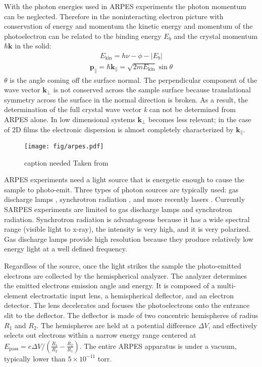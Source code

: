 \documentclass[12pt]{article}
\begin{document}
With the photon energies used in ARPES experiments the photon momentum can be neglected.
Therefore in the noninteracting electron picture with conservation of energy and momentum the kinetic energy and momentum of the photoelectron can be related to the binding energy $E_b$ and the crystal momentum $\hbar\boldsymbol{k}$ in the solid\cite{Damascelli}:
\begin{align}
  E_{\text{kin}}=h\nu-\phi-|E_b|
\end{align}
\begin{align}
  \boldsymbol{p_{\parallel}}=\hbar\boldsymbol{k_{\parallel}}=\sqrt{2mE_{\text{kin}}}\sin\theta
\end{align}
$\theta$ is the angle coming off the surface normal.
The perpendicular component of the wave vector $\boldsymbol{k_{\perp}}$ is not conserved across the sample surface because translational symmetry across the surface in the normal direction is broken.  
As a result, the determination of the full crystal wave vector \emph{k} can not be determined from ARPES alone.
In low dimensional systems $\boldsymbol{k_{\perp}}$ becomes less relevant; in the case of 2D films the electronic dispersion is almost completely characterized by $\boldsymbol{k_{\parallel}}$.

\begin{figure}[h]
  \centering
  \texttt{[image: fig/arpes.pdf]}
  \caption[should I put this here?]
  {caption needed Taken from \cite{Damascelli}}
  \label{fig:asymmetry}
\end{figure}
ARPES experiments need a light source that is energetic enough to cause the sample to photo-emit.
Three types of photon sources are typically used:  gas discharge lamps \cite{Damascelli}, synchrotron radiation \cite{Damascelli}, and more recently lasers \cite{Dessau}.
Currently SARPES experiments are limited to gas discharge lamps and synchrotron radiation.
Synchrotron radiation is advantageous because it has a wide spectral range (visible light to x-ray), the intensity is very high, and it is very polarized.
Gas discharge lamps provide high resolution because they produce relatively low energy light at a well defined frequency.

Regardless of the source, once the light strikes the sample the photo-emitted electrons are collected by the hemispherical analyzer.
The analyzer determines the emitted electrons emission angle and energy.
It is composed of a multi-element electrostatic input lens, a hemispherical deflector, and an electron detector.
The lens decelerates and focuses the photoelectrons onto the entrance slit to the deflector.
The deflector is made of two concentric hemispheres of radius $R_1$ and $R_2$.
The hemispheres are held at a potential difference $\Delta V$, and effectively selects out electrons within a narrow energy range centered at $E_{\text{pass}}=e\Delta V / (\frac{R_1}{R_2}-\frac{R_2}{R_1})$.
The entire ARPES apparatus is under a vacuum, typically lower than $5\times10^{-11}$ torr.
\end{document}
